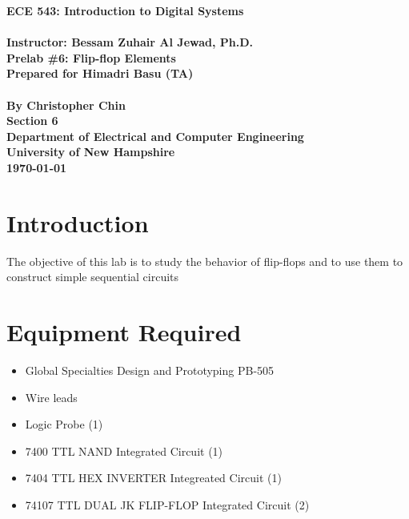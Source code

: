 \documentclass[11pt,a4paper]{article}
\begin{document}
\begin{center}
\textbf{
    \Large{ECE 543: Introduction to Digital Systems}
    \\~\\
    \large{Instructor: Bessam Zuhair Al Jewad, Ph.D.}
    \\[1.25in]
    \LARGE{Prelab \#6: Flip-flop Elements}
    \\[0.62in]
    \large{Prepared for Himadri Basu (TA)\\~\\By Christopher Chin}
    \\[1.25in]
    \LARGE{Section 6}
    \\[1.25in]
    \Large{Department of Electrical and Computer Engineering\\
           University of New Hampshire}
    \\[1.25in]
    \Large{\today}
}
\end{center}
\clearpage
{}

\tableofcontents
\pagebreak

\section{Introduction}
    The objective of this lab is to study the behavior of flip-flops and
    to use them to construct simple sequential circuits
\section{Equipment Required}
\begin{itemize}
    \item Global Specialties Design and Prototyping PB-505
    \item Wire leads
    \item Logic Probe (1)
    \item 7400 TTL NAND Integrated Circuit (1)
    \item 7404 TTL HEX INVERTER Integreated Circuit (1)
    \item 74107 TTL DUAL JK FLIP-FLOP Integrated Circuit (2)
\end{itemize}
\end{document}
